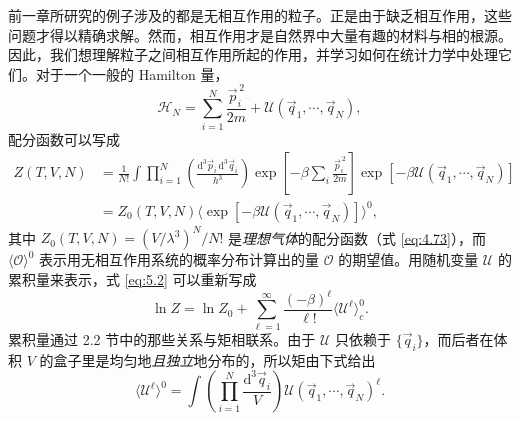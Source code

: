 

前一章所研究的例子涉及的都是无相互作用的粒子。正是由于缺乏相互作用，这些问题才得以精确求解。然而，相互作用才是自然界中大量有趣的材料与相的根源。因此，我们想理解粒子之间相互作用所起的作用，并学习如何在统计力学中处理它们。对于一个一般的 Hamilton 量，
\begin{equation}\label{eq:5.1}
\mathscr H_N=\sum_{i=1}^N\frac{\vec p_i^{\,2}}{2m}+\mathcal U(\vec q_1,\cdots,\vec q_N),
\end{equation}
配分函数可以写成
\begin{equation}\label{eq:5.2}
\begin{aligned}
Z(T,V,N)&=\frac{1}{N!}\int\prod_{i=1}^N\left(\frac{\mathrm{d}^3\vec p_i\,\mathrm{d}^3\vec q_i}{h^3}\right)\exp\left[-\beta\sum_i\frac{\vec p_i^{\,2}}{2m}\right]\exp\left[-\beta\mathcal U(\vec q_1,\cdots,\vec q_N)\right]\\
&=Z_0(T,V,N)\big\langle\exp\left[-\beta\mathcal U(\vec q_1,\cdots,\vec q_N)\right]\big\rangle^0,
\end{aligned}
\end{equation}
其中 $Z_0(T,V,N)=(V/\lambda^3)^N/N!$ 是\emph{理想气体}的配分函数（式 \eqref{eq:4.73}），而 $\langle\mathcal O\rangle^0$ 表示用无相互作用系统的概率分布计算出的量 $\mathcal O$ 的期望值。用随机变量 $\mathcal U$ 的累积量来表示，式 \eqref{eq:5.2} 可以重新写成
\begin{equation}\label{eq:5.3}
\ln Z=\ln Z_0+\sum_{\ell=1}^\infty\frac{(-\beta)^\ell}{\ell!}\big\langle\mathcal U^\ell\big\rangle_c^0.
\end{equation}
累积量通过 2.2 节中的那些关系与矩相联系。由于 $\mathcal U$ 只依赖于 $\{\vec q_i\}$，而后者在体积 $V$ 的盒子里是均匀地\emph{且独立}地分布的，所以矩由下式给出
\begin{equation}\label{eq:5.4}
\big\langle\mathcal U^\ell\big\rangle^0=\int\left(\prod_{i=1}^N\frac{\mathrm{d}^3\vec q_i}{V}\right)\mathcal U(\vec q_1,\cdots,\vec q_N)^\ell.
\end{equation}


